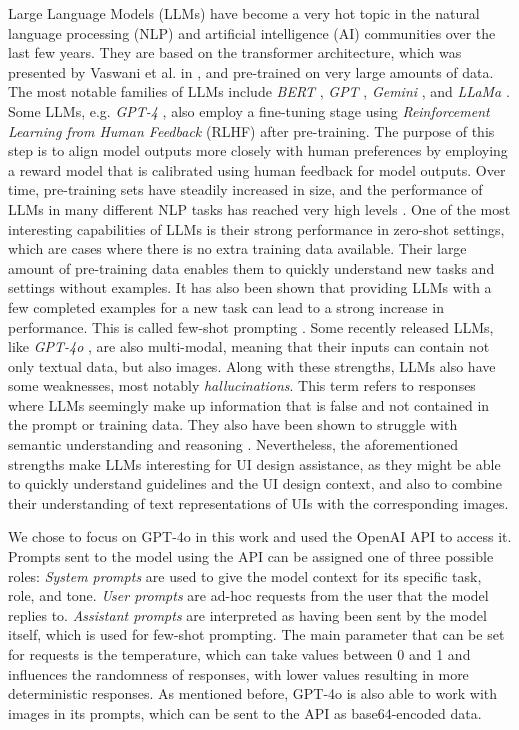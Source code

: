 \documentclass[11pt,titlepage,oneside,openany]{book}
\begin{document}
Large Language Models (LLMs) have become a very hot topic in the natural language processing (NLP) and artificial intelligence (AI) communities over the last few years. They are based on the transformer architecture, which was presented by Vaswani et al. in \cite{vaswani_attention_2017}, and pre-trained on very large amounts of data. The most notable families of LLMs include \emph{BERT} \cite{devlin_bert_2018}, \emph{GPT} \cite{radford_improving_2018}, \emph{Gemini} \cite{gemini_team_gemini_2024}, and \emph{LLaMa} \cite{touvron_llama_2023}. Some LLMs, e.g. \emph{GPT-4} \cite{openai_gpt-4_2023}, also employ a fine-tuning stage using \emph{Reinforcement Learning from Human Feedback} (RLHF) \cite{christiano_deep_2017} after pre-training. The purpose of this step is to align model outputs more closely with human preferences by employing a reward model that is calibrated using human feedback for model outputs. Over time, pre-training sets have steadily increased in size, and the performance of LLMs in many different NLP tasks has reached very high levels \cite{minaee_large_2024}. One of the most interesting capabilities of LLMs is their strong performance in zero-shot settings, which are cases where there is no extra training data available. Their large amount of pre-training data enables them to quickly understand new tasks and settings without examples. It has also been shown that providing LLMs with a few completed examples for a new task can lead to a strong increase in performance. This is called few-shot prompting \cite{liu_pre-train_2023}. Some recently released LLMs, like \emph{GPT-4o} \cite{openai-gpt4o}, are also multi-modal, meaning that their inputs can contain not only textual data, but also images. Along with these strengths, LLMs also have some weaknesses, most notably \emph{hallucinations}. This term refers to responses where LLMs seemingly make up information that is false and not contained in the prompt or training data. They also have been shown to struggle with semantic understanding and reasoning \cite{chang_survey_2024, tao_eveval_2023, riccardi_two_2023}. Nevertheless, the aforementioned strengths make LLMs interesting for UI design assistance, as they might be able to quickly understand guidelines and the UI design context, and also to combine their understanding of text representations of UIs with the corresponding images. 

We chose to focus on GPT-4o in this work and used the OpenAI API \cite{noauthor_openai_nodate} to access it. Prompts sent to the model using the API can be assigned one of three possible roles: \emph{System prompts} are used to give the model context for its specific task, role, and tone. \emph{User prompts} are ad-hoc requests from the user that the model replies to. \emph{Assistant prompts} are interpreted as having been sent by the model itself, which is used for few-shot prompting. The main parameter that can be set for requests is the temperature, which can take values between 0 and 1 and influences the randomness of responses, with lower values resulting in more deterministic responses. As mentioned before, GPT-4o is also able to work with images in its prompts, which can be sent to the API as base64-encoded data. 
\end{document}
